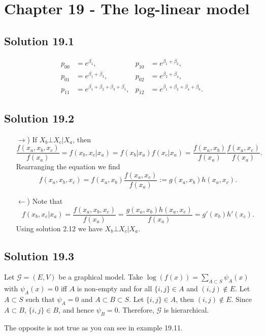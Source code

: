 \section*{Chapter 19 - The log-linear model}

\subsection*{Solution 19.1}

\begin{align*}
    p_{00} &= e^{\beta_1}, & p_{10} &= e^{\beta_1 + \beta_2}, \\
    p_{01} &= e^{\beta_1 + \beta_3}, & p_{02} &= e^{\beta_2 + \beta_4}, \\
    p_{11} &= e^{\beta_1 + \beta_2 + \beta_3 + \beta_5}, & p_{12} &= e^{\beta_1 + \beta_2 + \beta_4 + \beta_6}.
\end{align*}


\subsection*{Solution 19.2}

\begin{itemize}
    \item[$\rightarrow$)] If $X_b \bot X_c | X_a$, then
        \begin{equation*}
            \frac{f(x_a, x_b, x_c)}{f(x_a)}
                = f(x_b, x_c| x_a) = f(x_b|x_a) f(x_c|x_a)
                = \frac{f(x_a, x_b)}{f(x_a)} \frac{f(x_a, x_c)}{f(x_a)}.
        \end{equation*}
        Rearranging the equation we find
        \begin{equation*}
            f(x_a, x_b, x_c) = f(x_a, x_b) \frac{f(x_a, x_c)}{f(x_a)}
                := g(x_a, x_b) h(x_a, x_c).
        \end{equation*}
    \item[$\leftarrow$)] Note that
        \begin{equation*}
            f(x_b, x_c|x_a) = \frac{f(x_a, x_b, x_c)}{f(x_a)}
                = \frac{g(x_a, x_b) h(x_a, x_c)}{f(x_a)}
                = g'(x_b) h'(x_c).
        \end{equation*}
        Using solution 2.12 we have $X_b \bot X_c | X_a$.
\end{itemize}


\subsection*{Solution 19.3}

Let $\mathcal{G} = (E, V)$ be a graphical model.
Take $\log(f(x)) = \sum_{A \subset S} \psi_A(x)$ with $\psi_A(x) = 0$ iff $A$ is non-empty and for all $\{i, j\} \in A$ and $(i, j) \notin E$.
Let $A \subset S$ such that $\psi_A = 0$ and $A \subset B \subset S$.
Let $\{i, j\} \in A$, then $(i, j) \notin E$.
Since $A \subset B$, $\{i, j\} \in B$, and hence $\psi_B = 0$.
Therefore, $\mathcal{G}$ is hierarchical.

The opposite is not true as you can see in example 19.11.
